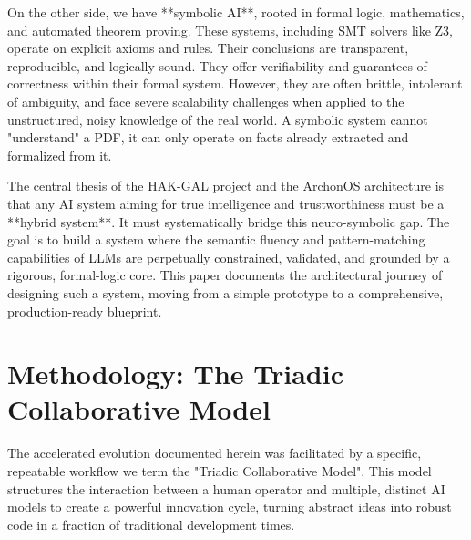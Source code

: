 \documentclass[11pt, a4paper]{article}
\begin{document}
On the other side, we have **symbolic AI**, rooted in formal logic, mathematics, and automated theorem proving. These systems, including SMT solvers like Z3, operate on explicit axioms and rules. Their conclusions are transparent, reproducible, and logically sound. They offer verifiability and guarantees of correctness within their formal system. However, they are often brittle, intolerant of ambiguity, and face severe scalability challenges when applied to the unstructured, noisy knowledge of the real world. A symbolic system cannot "understand" a PDF, it can only operate on facts already extracted and formalized from it.

The central thesis of the HAK-GAL project and the ArchonOS architecture is that any AI system aiming for true intelligence and trustworthiness must be a **hybrid system**. It must systematically bridge this neuro-symbolic gap. The goal is to build a system where the semantic fluency and pattern-matching capabilities of LLMs are perpetually constrained, validated, and grounded by a rigorous, formal-logic core. This paper documents the architectural journey of designing such a system, moving from a simple prototype to a comprehensive, production-ready blueprint.

\section{Methodology: The Triadic Collaborative Model}
\label{sec:methodology}

The accelerated evolution documented herein was facilitated by a specific, repeatable workflow we term the "Triadic Collaborative Model". This model structures the interaction between a human operator and multiple, distinct AI models to create a powerful innovation cycle, turning abstract ideas into robust code in a fraction of traditional development times.
\end{document}
